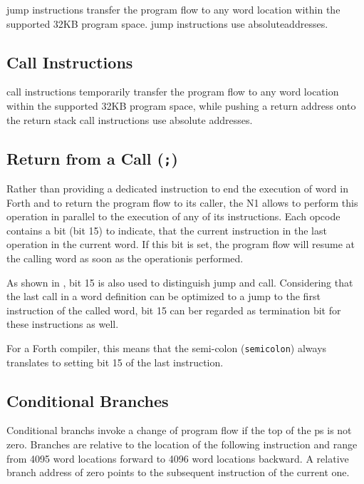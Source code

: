 \Gls{jump} instructions transfer the program flow to any \gls{word}
location within the supported 32KB program space. \Gls{jump} instructions
use absoluteaddresses. 

\subsection{Call Instructions}
\label{opcodes:call}

\Gls{call} instructions temporarily transfer the program flow to any \gls{word}
location within the
supported 32KB program space, while pushing a return address onto
the return stack \gls{call} instructions use absolute addresses. 

\subsection{Return from a Call (\texttt{;})}
\label{opcodes:rtc}

Rather than  providing a dedicated instruction to end the execution of 
word in Forth and to return the program flow to its caller, the N1 allows
to perform this operation in parallel to the execution of any of its
instructions. Each \gls{opcode} contains a bit (bit 15) to indicate, that the
current instruction in the last operation in the current word. If this bit
is set, the program flow will resume at the calling word as soon as the
operationis performed.

As shown in , bit 15 is also used to distinguish jump
and call. Considering that the last call in a word definition can be optimized
to a jump to the first instruction of the called word, bit 15 can ber regarded
as termination bit for these instructions as well.

For a Forth compiler, this means that the semi-colon (\texttt{\gls{semicolon}})
always translates to setting bit 15 of the last instruction.

\subsection{Conditional Branches}
\label{opcodes:branch}

Conditional \glspl{branch} invoke a change of program flow if the top of the
\gls{ps} is not zero. Branches are relative to the location of the
following instruction and range from 4095 \gls{word}
locations forward to 4096 \gls{word}
locations backward. A relative \gls{branch}
address of zero points to the subsequent instruction of the current one.

